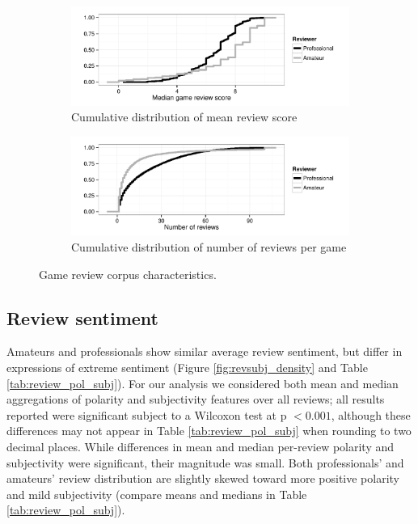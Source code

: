 \documentclass{sig-alternate}
\begin{document}
\begin{figure}[tb]
\centering


\begin{subfigure}[b]{\linewidth}
\includegraphics[width=\linewidth]{./console_games_scoremedian_ecdf}
\caption{Cumulative distribution of mean review score}
\label{fig:game_score}
\end{subfigure}
\begin{subfigure}[b]{\linewidth}
\includegraphics[width=\linewidth]{./console_games_numreviews_ecdf}
\caption{Cumulative distribution of number of reviews per game}
\label{fig:game_reviewnum}
\end{subfigure}
\caption{Game review corpus characteristics.}
\label{fig:revscore_console}
\end{figure}


\subsection{Review sentiment}
Amateurs and professionals show similar average review sentiment, but differ in expressions of extreme sentiment (Figure \ref{fig:revsubj_density} and Table \ref{tab:review_pol_subj}).
For our analysis we considered both mean and median aggregations of
polarity and subjectivity features over all reviews; all results
reported were significant subject to a Wilcoxon test at p $< 0.001$, although these differences may not appear in Table \ref{tab:review_pol_subj} when rounding to two decimal places. While differences in mean and median per-review polarity and subjectivity were significant, their magnitude was small.
Both professionals' and amateurs' review distribution are slightly skewed toward more positive polarity and mild subjectivity (compare means and medians in Table \ref{tab:review_pol_subj}). 
\end{document}
